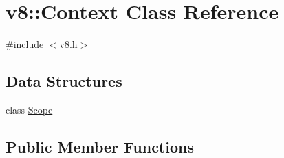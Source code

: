 \hypertarget{classv8_1_1Context}{\section{v8\-:\-:Context Class Reference}
\label{classv8_1_1Context}
}


{\ttfamily \#include $<$v8.\-h$>$}

\subsection*{Data Structures}
\begin{DoxyCompactItemize}
\item 
class \hyperlink{classv8_1_1Context_1_1Scope}{Scope}
\end{DoxyCompactItemize}
\subsection*{Public Member Functions}
